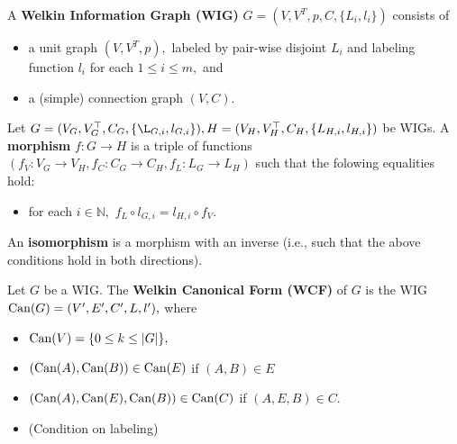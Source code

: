\begin{definition} A \textbf{Welkin Information Graph (WIG)} $G = (V, V^{T}, p, C, \{L_{i}, l_{i}\})$ consists of
  \begin{itemize}
    \item a unit graph $(V, V^{T}, p),$ labeled by pair-wise disjoint $L_{i}$ and labeling function $l_{i}$ for each $1 \leq i \leq m,$ and
    \item a (simple) connection graph $(V, C).$
  \end{itemize}
\end{definition}

\begin{definition}
  Let $G = (V_{G}, V^{\top}_{G}, C_{G}, \{\L_{G, i}, l_{G, i}\}), H = (V_{H}, V^{\top}_{H}, C_{H}, \{L_{H, i}, l_{H, i}\})$ be WIGs. A \textbf{morphism} $f: G \to H$ is a triple of functions $(f_{V}: V_{G} \to V_{H}, f_{C}: C_{G} \to C_{H}, f_{L}: L_{G} \to L_{H})$ such that the folowing equalities hold:
    \begin{itemize}
    \item for each $i \in \mathbb{N},$ $f_{L} \circ l_{G,i} = l_{H, i} \circ f_{V}.$
  \end{itemize}
  An \textbf{isomorphism} is a morphism with an inverse (i.e., such that the above conditions hold in both directions).
\end{definition}




\begin{definition}
  Let $G$ be a WIG. The \textbf{Welkin Canonical Form (WCF)} of $G$ is the WIG $\textrm{Can}(G) = (V', E', C', L, l'),$
  where
  \begin{itemize}
    \item $\textrm{Can}(V) = \{0 \leq k \leq |G|\},$
    \item $(\textrm{Can}(A), \textrm{Can}(B)) \in \textrm{Can}(E)$ if $(A, B) \in E$
    \item $(\textrm{Can}(A), \textrm{Can}(E), \textrm{Can}(B)) \in \textrm{Can}(C)$ if $(A, E, B) \in C.$
    \item (Condition on labeling)
  \end{itemize}


\end{definition}


